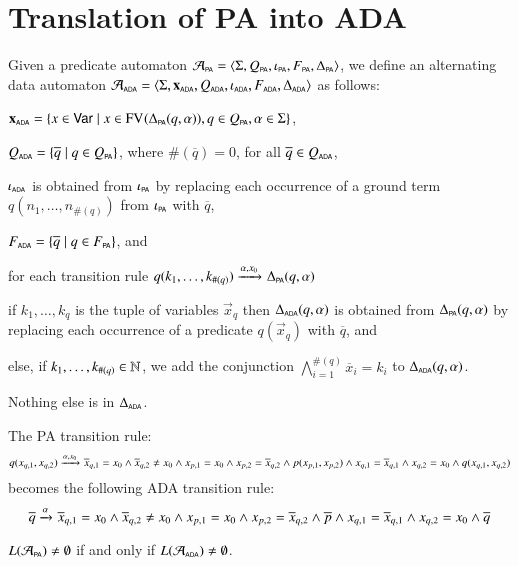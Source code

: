 \documentclass{llncs}
\begin{document}
\section{Translation of PA into ADA}

Given a predicate automaton $\A_\PA = \tuple{\Sigma, Q_\PA, \iota_\PA,
  F_\PA, \Delta_\PA}$, we define an alternating data automaton
$\A_\ADA = \tuple{\Sigma, \vec{x}_\ADA, Q_\ADA, \iota_\ADA, F_\ADA,
  \Delta_\ADA}$ as follows: \begin{compactitem}
\item $\vec{x}_\ADA = \set{x \in \vars \mid x \in \fv{}{\Delta_\PA(q,\alpha)}, q \in Q_\PA, \alpha \in \Sigma}$, 
%
\item $Q_\ADA = \set{\overline{q} \mid q \in Q_\PA}$, where $\#(\overline{q}) = 0$, for all $\overline{q} \in Q_\ADA$,
%
\item $\iota_\ADA$ is obtained from $\iota_\PA$ by replacing each
  occurrence of a ground term $q(n_1,\ldots,n_{\#(q)})$ from
  $\iota_\PA$ with $\overline{q}$,
%
\item $F_\ADA = \set{\overline{q} \mid q \in F_\PA}$, and 
%
\item for each transition rule \(q(k_1,\ldots,k_{\#(q)}) \arrow{\alpha,x_0}{}
  \Delta_\PA(q,\alpha)\) \begin{compactitem}
  \item if \(k_1,\ldots,k_q\) is the tuple of variables $\vec{x}_q$
    then \(\Delta_\ADA(q,\alpha)\) is obtained from
    \(\Delta_\PA(q,\alpha)\) by replacing each occurrence of a
    predicate $q(\vec{x}_q)$ with $\overline{q}$, and
\item else, if \(k_1,\ldots,k_{\#(q)} \in \nat\), we add the
  conjunction $\bigwedge_{i=1}^{\#(q)} \overline{x}_i = k_i$ to
  \(\Delta_\ADA(q,\alpha)\).
  \end{compactitem}
  Nothing else is in $\Delta_\ADA$. 
\end{compactitem}

\begin{example}
The PA transition rule: 
\[q(x_{q,1},x_{q,2})
\arrow{\alpha,x_0}{} \overline{x}_{q,1} = x_0 \wedge
\overline{x}_{q,2} \neq x_0 \wedge x_{p,1} = x_0 \wedge x_{p,2} =
\overline{x}_{q,2} \wedge p(x_{p,1},x_{p,2}) \wedge x_{q,1} =
\overline{x}_{q,1} \wedge x_{q,2} = x_0 \wedge q(x_{q,1},x_{q,2})\]
becomes the following ADA transition rule:
\[\overline{q} \arrow{\alpha}{} \overline{x}_{q,1} = x_0 \wedge
\overline{x}_{q,2} \neq x_0 \wedge x_{p,1} = x_0 \wedge x_{p,2} =
\overline{x}_{q,2} \wedge \overline{p} \wedge x_{q,1} =
\overline{x}_{q,1} \wedge x_{q,2} = x_0 \wedge \overline{q}\]
\end{example}

\begin{claim}
  $L(\A_\PA) \neq \emptyset$ if and only if $L(\A_\ADA) \neq \emptyset$.
\end{claim}

\end{document}
